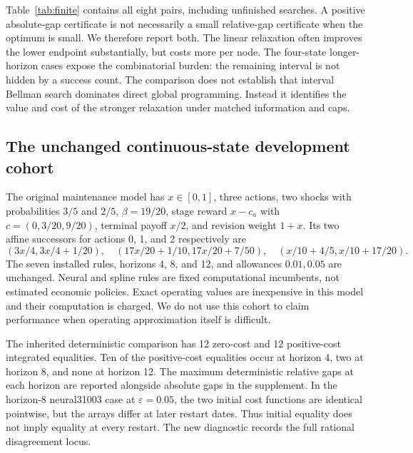 Table~\ref{tab:finite} contains all eight pairs, including unfinished searches. A positive absolute-gap certificate is not necessarily a small relative-gap certificate when the optimum is small. We therefore report both. The linear relaxation often improves the lower endpoint substantially, but costs more per node. The four-state longer-horizon cases expose the combinatorial burden: the remaining interval is not hidden by a success count. The comparison does not establish that interval Bellman search dominates direct global programming. Instead it identifies the value and cost of the stronger relaxation under matched information and caps.

\subsection{The unchanged continuous-state development cohort}\label{sec:primary}
The original maintenance model has $x\in[0,1]$, three actions, two shocks with probabilities $3/5$ and $2/5$, $\beta=19/20$, stage reward $x-c_a$ with $c=(0,3/20,9/20)$, terminal payoff $x/2$, and revision weight $1+x$. Its two affine successors for actions 0, 1, and 2 respectively are
\[
 (3x/4,3x/4+1/20),\quad
 (17x/20+1/10,17x/20+7/50),\quad
 (x/10+4/5,x/10+17/20).
\]
The seven installed rules, horizons 4, 8, and 12, and allowances $0.01,0.05$ are unchanged. Neural and spline rules are fixed computational incumbents, not estimated economic policies. Exact operating values are inexpensive in this model and their computation is charged. We do not use this cohort to claim performance when operating approximation itself is difficult.

The inherited deterministic comparison has 12 zero-cost and 12 positive-cost integrated equalities. Ten of the positive-cost equalities occur at horizon 4, two at horizon 8, and none at horizon 12. The maximum deterministic relative gaps at each horizon are reported alongside absolute gaps in the supplement. In the horizon-8 neural31003 case at $\varepsilon=0.05$, the two initial cost functions are identical pointwise, but the arrays differ at later restart dates. Thus initial equality does not imply equality at every restart. The new diagnostic records the full rational disagreement locus.

